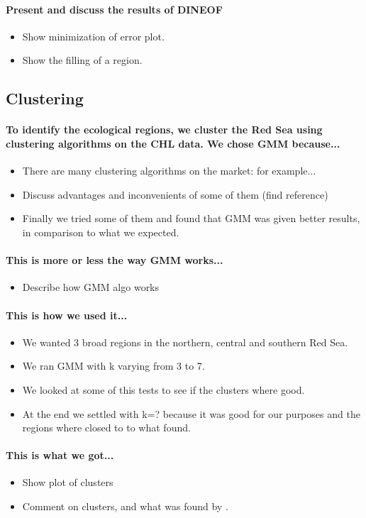 \paragraph{Present and discuss the results of DINEOF}

\begin{itemize}
  \item Show minimization of error plot.
  \item Show the filling of a region.
\end{itemize}

\subsection{Clustering}

\paragraph{To identify the ecological regions, we cluster the Red Sea using
clustering algorithms on the CHL data. We chose GMM because...}

\begin{itemize}
  \item There are many clustering algorithms on the market: for example...
  \item Discuss advantages and inconvenients of some of them (find reference)
  \item Finally we tried some of them and found that GMM was given better
results, in comparison to what we expected.
\end{itemize}

\paragraph{This is more or less the way GMM works...}

\begin{itemize}
  \item Describe how GMM algo works
\end{itemize}

\paragraph{This is how we used it...}

\begin{itemize}
  \item We wanted 3 broad regions in the northern, central and southern Red Sea.
  \item We ran GMM with k varying from 3 to 7.
  \item We looked at some of this tests to see if the clusters where good.
  \item At the end we settled with k=? because it was good for our purposes and
the regions where closed to to what \citet{Raitsos2013} found.
\end{itemize}

\paragraph{This is what we got...}

\begin{itemize}
  \item Show plot of clusters
  \item Comment on clusters, and what was found by \citet{Raitsos2013}.
\end{itemize}
